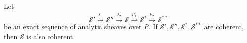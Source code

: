 Let
$$
\mathcal{S}' \xrightarrow{j_1} \mathcal{S}'' \xrightarrow{j_2} \mathcal{S} \xrightarrow{p_1} \mathcal{S}^* \xrightarrow{p_2} \mathcal{S}^{**}
$$
be an exact sequence of analytic sheaves over $B$. If $\mathcal{S}', \mathcal{S}'', \mathcal{S}^*, \mathcal{S}^{**}$ are coherent, then $\mathcal{S}$ is also coherent.

